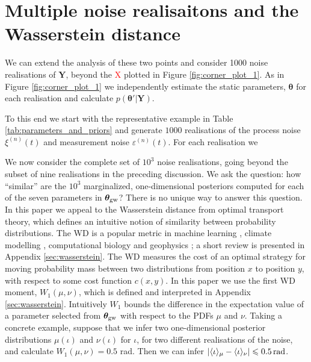 \documentclass[fleqn,usenatbib,useAMS]{mnras}
\begin{document}
\section{Multiple noise realisaitons and the Wasserstein distance}


We can extend the analysis of these two points and consider 1000 noise realisations of $\boldsymbol{Y}$, beyond the \textcolor{red}{X} plotted in Figure \ref{fig:corner_plot_1}. As in Figure \ref{fig:corner_plot_1} we independently estimate the static parameters, $\boldsymbol{\theta}$ for each realisation and calculate $p({\boldsymbol{\theta'}} | {\boldsymbol{Y}})$. 




To this end we start with the representative example in Table \ref{tab:parameters_and_priors} and generate $1000$ realisations of the process noise $\xi^{(n)}(t)$ and measurement noise $\varepsilon^{(n)}(t)$. For each realisation we 


We now consider the complete set of $10^3$ noise realisations, going beyond the subset of nine realisations in the preceding discussion. We ask the question: how ``similar'' are the $10^3$ marginalized, one-dimensional posteriors computed for each of the seven parameters in ${\boldsymbol{\theta}}_{\rm gw}$? There is no unique way to answer this question. In this paper we appeal to the Wasserstein distance \citep[WD;][]{Wasserstein,Villani2009} from optimal transport theory, which defines an intuitive notion of similarity between probability distributions. The WD is a popular metric in machine learning \citep{2017arXiv170107875A}, climate modelling \citep{2022JCli...35.1215P,2023QJRMS.149..843K}, computational biology \citep{GONZALEZDELGADO2023168053} and geophysics \citep{2023GeoRL..5003880M}; a short review is presented in Appendix \ref{sec:wasserstein}. The WD measures the cost of an optimal strategy for moving probability mass between two distributions from position $x$ to position $y$, with respect to some cost function $c(x,y)$. In this paper we use the first WD moment, $W_1(\mu,\nu)$, which is defined and interpreted in Appendix \ref{sec:wasserstein}. Intuitively $W_1$ bounds the difference in the expectation value of a parameter selected from ${\boldsymbol{\theta}}_{\rm gw}$ with respect to the PDFs $\mu$ and $\nu$. Taking a concrete example, suppose that we infer two one-dimensional posterior distributions $\mu(\iota)$ and $\nu(\iota)$ for $\iota$, for two different realisations of the noise, and calculate $W_1(\mu, \nu) =0.5$ rad. Then we can infer $| \langle \iota \rangle_\mu - \langle \iota \rangle_\nu | \leq 0.5 \, {\rm rad}$. \newline 
\end{document}
